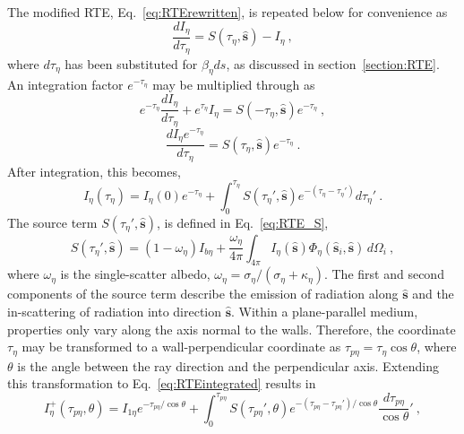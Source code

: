 The modified RTE, Eq.~\ref{eq:RTErewritten}, is repeated below for convenience as 
\begin{equation}
    \frac{dI_\eta{}}{d\tau{}_\eta} = S(\tau_\eta,\hat{\textbf{s}})-I_\eta{} ~,
    \label{eq:RTErepeated}
\end{equation}
where $d\tau_\eta$ has been substituted for $\beta_\eta{}ds$, as discussed in section~\ref{section:RTE}. An integration factor $e^{-\tau_\eta}$ may be multiplied through as  
\begin{equation}
    e^{-\tau_\eta}\frac{dI_\eta{}}{d\tau{}_\eta} + e^{\tau_\eta}I_\eta= S(-\tau_\eta,\hat{\textbf{s}})e^{-\tau_\eta} ~,
\end{equation}
\begin{equation}
    \frac{dI_\eta{}e^{-\tau_\eta}}{d\tau{}_\eta} = S(\tau_\eta,\hat{\textbf{s}})e^{-\tau_\eta} \ .
\end{equation}
After integration, this becomes,
\begin{equation}
    I_\eta{}(\tau_\eta) = I_\eta{}(0)e^{-\tau_\eta} + \int_0^{\tau_\eta}{S(\tau_\eta',\hat{\textbf{s}})e^{-(\tau_\eta-\tau_\eta')}}d\tau_\eta' ~.
    \label{eq:RTEintegrated}
\end{equation}
The source term $S(\tau_\eta',\hat{\textbf{s}})$, is defined in Eq.~\ref{eq:RTE_S},
\begin{equation}
    S(\tau_\eta',\hat{\textbf{s}}) = (1-\omega{}_\eta{})I_{b\eta{}}+\frac{\omega{}_\eta{}}{4\pi}\int_{4\pi{}}{I_\eta{}(\hat{\textbf{s}})\Phi_\eta{}(\hat{\textbf{s}}_i,\hat{\textbf{s}})}\,d\Omega{}_i ~,
    \label{eq:RTE_S}
\end{equation}
where $\omega_\eta$ is the single-scatter albedo, $\omega_\eta=\sigma_\eta/(\sigma_\eta+\kappa_\eta)$. The first and second components of the source term describe the emission of radiation along $\hat{\textbf{s}}$ and the in-scattering of radiation into direction $\hat{\textbf{s}}$. Within a plane-parallel medium, properties only vary along the axis normal to the walls. Therefore, the coordinate $\tau{}_\eta{}$ may be transformed to a wall-perpendicular coordinate as $\tau{}_{p\eta{}}=\tau{}_\eta{}\cos{\theta}$, where $\theta$ is the angle between the ray direction and the perpendicular axis. Extending this transformation to Eq.~\ref{eq:RTEintegrated} results in
\begin{equation}
    I^+_\eta{}(\tau_{p\eta},\theta) = I_{1\eta{}}e^{-\tau_{p\eta}/\cos{\theta}} + \int_0^{\tau_{p\eta}}{S(\tau_{p\eta}',\theta)e^{-(\tau_{p\eta}-\tau_{p\eta}')/\cos{\theta}}}\frac{d\tau_{p\eta}}{\cos{\theta}}' \ ,
    \label{eq:RTEplus}
\end{equation}
